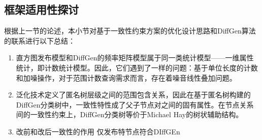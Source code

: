 \subsection{框架适用性探讨}

根据上一节的论述，本小节对基于一致性约束方案的优化设计思路和DiffGen算法的联系进行以下总结：
\begin{enumerate}
	\item 直方图发布模型和DiffGen的频率矩阵模型属于同一类统计模型——一维属性统计，即计数统计模型。因此，它们遇到了一样的问题：基于单位长度的计数和加噪操作，对于范围计数查询需求而言，存在着噪音线性叠加问题。
	\item 泛化技术定义了匿名树层级之间的范围包含关系，因此在基于匿名树构建的DiffGen分类树中，一致性特性成了父子节点对之间的固有属性。在节点关系间的一致性约束上，DiffGen分类树等价于Michael Hay的树状辅助结构。
	\item 改前和改后一致性的作用
	\tem 仅发布特节点符合DIffGEn
	
\end{enumerate}
